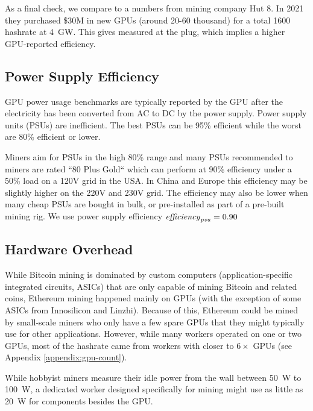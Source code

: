 As a final check, we compare to a numbers from mining company Hut 8\cite{pan_ethereum_2021}. In 2021 they purchased \$30M in new GPUs (around 20-60 thousand) for a total \SI{1600}{\giga\hps} hashrate at \SI{4}{\giga\watt}. This gives  measured at the plug, which implies a higher GPU-reported efficiency.

\subsection{Power Supply Efficiency}

GPU power usage benchmarks are typically reported by the GPU after the electricity has been converted from AC to DC by the power supply. Power supply units (PSUs) are inefficient. The best PSUs can be 95\% efficient while the worst are 80\% efficient or lower.

Miners aim for PSUs in the high 80\% range and many PSUs recommended to miners are rated ``80 Plus Gold`` which can perform at 90\% efficiency under a 50\% load on a 120V grid in the USA\cite{mpitziopoulos_what_2018}\cite{mpitziopoulos_best_2021}. In China and Europe this efficiency may be slightly higher on the 220V and 230V grid. The efficiency may also be lower when many cheap PSUs are bought in bulk, or pre-installed as part of a pre-built mining rig. We use power supply efficiency $\mathit{efficiency}_\mathit{psu} = 0.90$

\subsection{Hardware Overhead}

While Bitcoin mining is dominated by custom computers (application-specific integrated circuits, ASICs) that are only capable of mining Bitcoin and related coins, Ethereum mining happened mainly on GPUs (with the exception of some ASICs from Innosilicon\cite{innosilicon_innosilicon_2021} and Linzhi\cite{linzhi_linzhi_2020}). Because of this, Ethereum could be mined by small-scale miners who only have a few spare GPUs that they might typically use for other applications. However, while many workers operated on one or two GPUs, most of the hashrate came from workers with closer to $6\times$ GPUs (see Appendix \ref{appendix:gpu-count}).

While hobbyist miners measure their idle power from the wall between \SI{50}{\watt} to \SI{100}{\watt}\cite{frogi5_how_2017}, a dedicated worker designed specifically for mining might use as little as \SI{20}{\watt}\cite{red_panda_mining_testing_2020}\cite{rabid_mining_ethereum_2021} for components besides the GPU.

